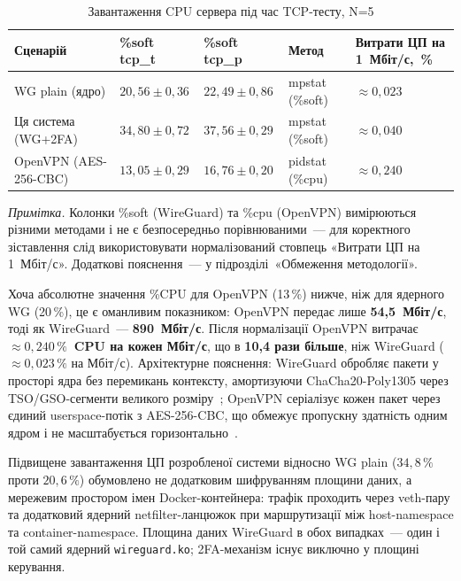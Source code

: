 \begin{table}[htbp]\centering
\caption{Завантаження CPU сервера під час TCP-тесту, N=5}
\label{tab:perf_cpu}
\begin{tabularx}{\textwidth}{|l|X|X|X|X|}\hline
\textbf{Сценарій}
  & \textbf{\%soft tcp\_t}
  & \textbf{\%soft tcp\_p}
  & \textbf{Метод}
  & \textbf{Витрати ЦП на 1~Мбіт/с,~\%} \\\hline
WG plain (ядро)
  & $20{,}56 \pm 0{,}36$
  & $22{,}49 \pm 0{,}86$
  & mpstat (\%soft)
  & $\approx 0{,}023$ \\\hline
Ця система (WG+2FA)
  & $34{,}80 \pm 0{,}72$
  & $37{,}56 \pm 0{,}29$
  & mpstat (\%soft)
  & $\approx 0{,}040$ \\\hline
OpenVPN (AES-256-CBC)
  & $13{,}05 \pm 0{,}29$
  & $16{,}76 \pm 0{,}20$
  & pidstat (\%cpu)
  & $\approx 0{,}240$ \\\hline
\end{tabularx}
\begin{minipage}{\textwidth}\small
\textit{Примітка.} Колонки \%soft (WireGuard) та \%cpu (OpenVPN) вимірюються
різними методами і не є безпосередньо порівнюваними~--- для коректного
зіставлення слід використовувати нормалізований стовпець «Витрати ЦП на
1~Мбіт/с». Додаткові пояснення~--- у підрозділі~«Обмеження методології».
\end{minipage}
\end{table}

Хоча абсолютне значення \%CPU для OpenVPN (13\,\%) нижче, ніж для ядерного
WG (20\,\%), це є оманливим показником: OpenVPN передає лише
\textbf{54{,}5~Мбіт/с}, тоді як WireGuard~--- \textbf{890~Мбіт/с}. Після
нормалізації OpenVPN витрачає \textbf{$\approx 0{,}240\,\%$~CPU на кожен
Мбіт/с}, що в \textbf{10{,}4 рази більше}, ніж WireGuard
($\approx 0{,}023\,\%$ на Мбіт/с). Архітектурне пояснення: WireGuard
обробляє пакети у просторі ядра без перемикань контексту, амортизуючи
ChaCha20-Poly1305 через TSO/GSO-сегменти великого розміру~\cite{donenfeld2017wireguard,perrin2018noise};
OpenVPN серіалізує кожен пакет через єдиний userspace-потік
з AES-256-CBC, що обмежує пропускну здатність одним ядром і не масштабується
горизонтально~\cite{openvpn2024}.

Підвищене завантаження ЦП розробленої системи відносно WG plain
($34{,}8\,\%$ проти $20{,}6\,\%$) обумовлено не додатковим шифруванням
площини даних, а мережевим простором імен Docker-контейнера: трафік
проходить через veth-пару та додатковий ядерний netfilter-ланцюжок при
маршрутизації між host-namespace та container-namespace. Площина даних WireGuard
в обох випадках~--- один і той самий ядерний \texttt{wireguard.ko};
2FA-механізм існує виключно у площині керування.

